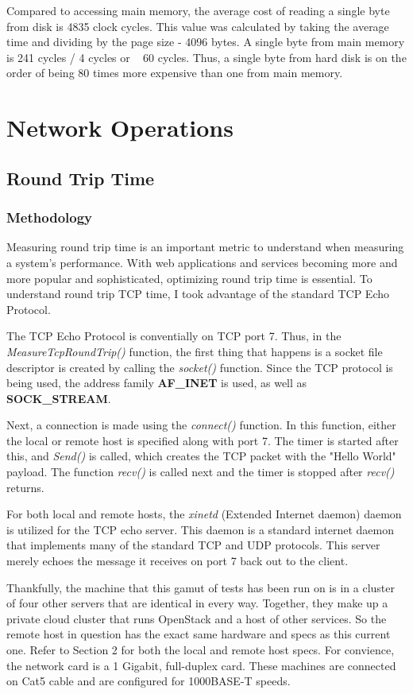 \documentclass[paper=a4, fontsize=11pt]{scrartcl}
\numberwithin{equation}{section}        %
\numberwithin{figure}{section}          %
\numberwithin{table}{section}               %
\begin{document}
Compared to accessing main memory, the average cost of reading a single byte from disk is 4835 clock cycles.  This value was calculated by taking the average time and dividing by the page size - 4096 bytes.  A single byte from main memory is 241 cycles / 4 cycles or ~ 60 cycles.  Thus, a single byte from hard disk is on the order of being 80 times more expensive than one from main memory.  

\section{Network Operations}
\subsection{Round Trip Time}
\subsubsection{Methodology}

Measuring round trip time is an important metric to understand when measuring a system's performance.  With web applications and services becoming more and more popular and sophisticated, optimizing round trip time is essential.  To understand round trip TCP time, I took advantage of the standard TCP Echo Protocol.

The TCP Echo Protocol is conventially on TCP port 7.  Thus, in the \textit{MeasureTcpRoundTrip()} function, the first thing that happens is a socket file descriptor is created by calling the \textit{socket()} function.  Since the TCP protocol is being used, the address family \textbf{AF\_INET} is used, as well as \textbf{SOCK\_STREAM}.

Next, a connection is made using the \textit{connect()} function.  In this function, either the local or remote host is specified along with port 7.  The timer is started after this, and \textit{Send()} is called, which creates the TCP packet with the "Hello World" payload.  The function \textit{recv()} is called next and the timer is stopped after \textit{recv()} returns.

For both local and remote hosts, the \textit{xinetd} (Extended Internet daemon) daemon is utilized for the TCP echo server.  This daemon is a standard internet daemon that implements many of the standard TCP and UDP protocols.  This server merely echoes the message it receives on port 7 back out to the client.

Thankfully, the machine that this gamut of tests has been run on is in a cluster of four other servers that are identical in every way.  Together, they make up a private cloud cluster that runs OpenStack and a host of other services.  So the remote host in question has the exact same hardware and specs as this current one.  Refer to Section 2 for both the local and remote host specs.  For convience, the network card is a 1 Gigabit, full-duplex card.  These machines are connected on Cat5 cable and are configured for 1000BASE-T speeds.
\end{document}

